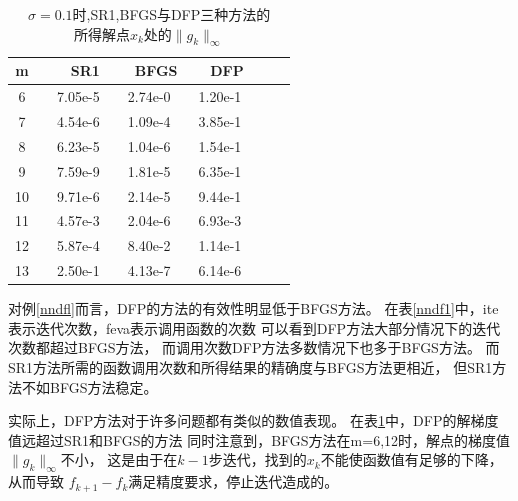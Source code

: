 \begin{example}
    \begin{table}[htbp]\center
        \caption{$\sigma = 0.1$时,SR1,BFGS与DFP三种方法的
                \\所得解点$x_k$处的$\|g_k\|_\infty$}
        \begin{tabular}{ccccccccccc}
        \toprule %
            \multicolumn{2}{c}{m}&& 
            \multicolumn{2}{c}{SR1}&                   \multicolumn{2}{c}{BFGS}&                  \multicolumn{2}{c}{DFP}&\\
        \hline %
            \multicolumn{2}{c}{6} & &7.05e-5& &2.74e-0& &1.20e-1& \\
            \multicolumn{2}{c}{7} & &4.54e-6& &1.09e-4& &3.85e-1& \\
            \multicolumn{2}{c}{8} & &6.23e-5& &1.04e-6& &1.54e-1& \\
            \multicolumn{2}{c}{9} & &7.59e-9& &1.81e-5& &6.35e-1& \\
            \multicolumn{2}{c}{10}& &9.71e-6& &2.14e-5& &9.44e-1& \\
            \multicolumn{2}{c}{11}& &4.57e-3& &2.04e-6& &6.93e-3& \\
            \multicolumn{2}{c}{12}& &5.87e-4& &8.40e-2& &1.14e-1& \\
            \multicolumn{2}{c}{13}& &2.50e-1& &4.13e-7& &6.14e-6& \\
        \bottomrule %
        \end{tabular}
        \label{nndf2}
    \end{table}
\end{example}

对例\ref{nndfl}而言，DFP的方法的有效性明显低于BFGS方法。
在表\ref{nndf1}中，ite表示迭代次数，feva表示调用函数的次数
可以看到DFP方法大部分情况下的迭代次数都超过BFGS方法，
而调用次数DFP方法多数情况下也多于BFGS方法。
而SR1方法所需的函数调用次数和所得结果的精确度与BFGS方法更相近，
但SR1方法不如BFGS方法稳定。

实际上，DFP方法对于许多问题都有类似的数值表现。
在表\ref{nndf2}中，DFP的解梯度值远超过SR1和BFGS的方法
同时注意到，BFGS方法在m=6,12时，解点的梯度值$\|g_k\|_\infty$不小，
这是由于在$k-1$步迭代，找到的$x_k$不能使函数值有足够的下降，从而导致
$f_{k+1}-f_{k}$满足精度要求，停止迭代造成的。
